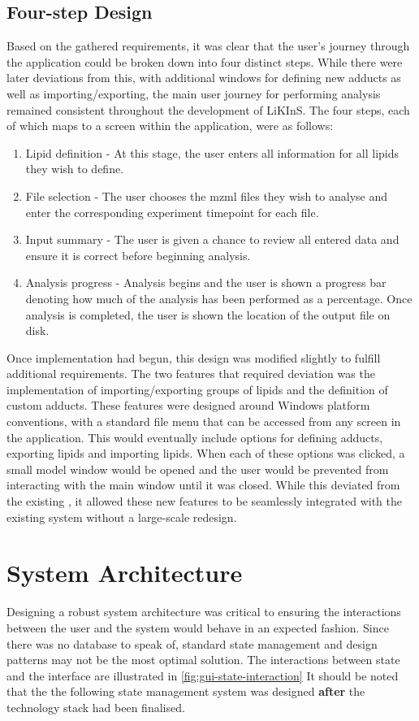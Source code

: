 \documentclass{l4proj}
\begin{document}
\subsection{Four-step Design}
Based on the gathered requirements, it was clear that the user's journey through the application could be broken down into four distinct steps. While there were later deviations from this, with additional windows for defining new adducts as well as importing/exporting, the main user journey for performing analysis remained consistent throughout the development of LiKInS. The four steps, each of which maps to a screen within the application, were as follows:
\begin{enumerate}
    \item Lipid definition - At this stage, the user enters all information for all lipids they wish to define.
    \item File selection - The user chooses the mzml files they wish to analyse and enter the corresponding experiment timepoint for each file.
    \item Input summary - The user is given a chance to review all entered data and ensure it is correct before beginning analysis.
    \item Analysis progress - Analysis begins and the user is shown a progress bar denoting how much of the analysis has been performed as a percentage. Once analysis is completed, the user is shown the location of the output file on disk.
\end{enumerate}
Once implementation had begun, this design was modified slightly to fulfill additional requirements. The two features that required deviation was the implementation of importing/exporting groups of lipids and the definition of custom adducts. These features were designed around Windows platform conventions, with a standard file menu that can be accessed from any screen in the application. This would eventually include options for defining adducts, exporting lipids and importing lipids. When each of these options was clicked, a small model window would be opened and the user would be prevented from interacting with the main window until it was closed. While this deviated from the existing , it allowed these new features to be seamlessly integrated with the existing system without a large-scale redesign.


\section{System Architecture} \label{system-architecture-design}
Designing a robust system architecture was critical to ensuring the interactions between the user and the system would behave in an expected fashion. Since there was no database to speak of, standard state management and design patterns may not be the most optimal solution. The interactions between state and the interface are illustrated in \ref{fig:gui-state-interaction} It should be noted that the the following state management system was designed \textbf{after} the technology stack had been finalised.
\end{document}
